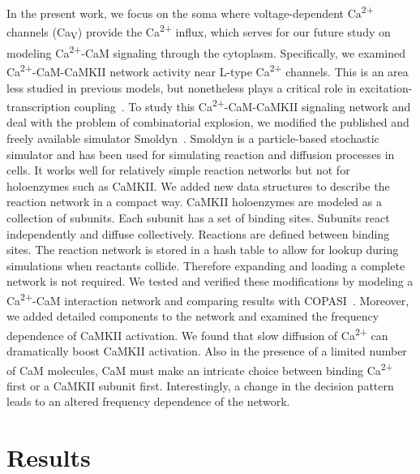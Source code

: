 \documentclass[10pt,letterpaper]{article}
\begin{document}
In the present work, we focus on the soma where voltage-dependent Ca\textsuperscript{2+} channels (Ca\textsubscript{V}) provide the Ca\textsuperscript{2+} influx, which serves for our future study on modeling Ca\textsuperscript{2+}-CaM signaling through the cytoplasm. Specifically, we examined Ca\textsuperscript{2+}-CaM-CaMKII network activity near L-type Ca\textsuperscript{2+} channels. This is an area less studied in previous models, but nonetheless plays a critical role in excitation-transcription coupling~\cite{Ma:2015bg,Li:2016cq}. To study this Ca\textsuperscript{2+}-CaM-CaMKII signaling network and deal with the problem of combinatorial explosion, we modified the published and freely available simulator Smoldyn~\cite{Andrews:2004fs}. Smoldyn is a particle-based stochastic simulator and has been used for simulating reaction and diffusion processes in cells. It works well for relatively simple reaction networks but not for holoenzymes such as CaMKII. We added new data structures to describe the reaction network in a compact way. CaMKII holoenzymes are modeled as a collection of subunits. Each subunit has a set of binding sites. Subunits react independently and diffuse collectively. Reactions are defined between binding sites. The reaction network is stored in a hash table to allow for lookup during simulations when reactants collide. Therefore expanding and loading a complete network is not required. We tested and verified these modifications by modeling a Ca\textsuperscript{2+}-CaM interaction network and comparing results with COPASI~\cite{Hoops:2006gy}. Moreover, we added detailed components to the network and examined the frequency dependence of CaMKII activation. We found that slow diffusion of Ca\textsuperscript{2+} can dramatically boost CaMKII activation. Also in the presence of a limited number of CaM molecules, CaM must make an intricate choice between binding Ca\textsuperscript{2+} first or a CaMKII subunit first. Interestingly, a change in the decision pattern leads to an altered frequency dependence of the network. 

\section*{Results}
\end{document}
